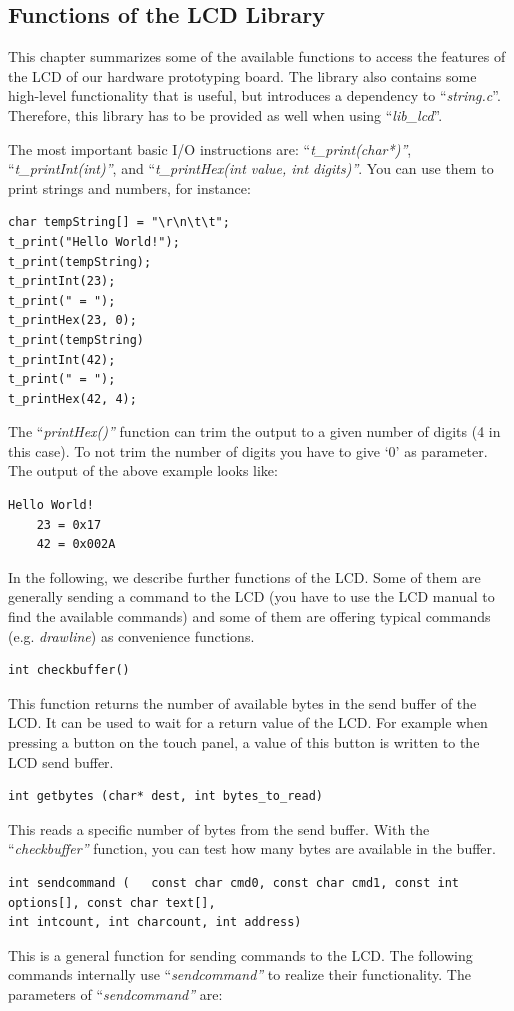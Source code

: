 \hypertarget{functions-of-the-lcd-library}{%
\subsection{Functions of the LCD
Library}\label{functions-of-the-lcd-library}}

This chapter summarizes some of the available functions to access the
features of the LCD of our hardware prototyping board. The library also
contains some high-level functionality that is useful, but introduces a
dependency to ``\emph{string.c}''. Therefore, this library has to be
provided as well when using ``\emph{lib\_lcd}''.

The most important basic I/O instructions are:
``\emph{t\_print(char*)''}, ``\emph{t\_printInt(int)''}, and
``\emph{t\_printHex(int value, int digits)''}. You can use them to print
strings and numbers, for instance:
\begin{lstlisting}
char tempString[] = "\r\n\t\t";
t_print("Hello World!");
t_print(tempString);
t_printInt(23);
t_print(" = ");
t_printHex(23, 0);
t_print(tempString)
t_printInt(42);
t_print(" = ");
t_printHex(42, 4);	
\end{lstlisting}
The ``\emph{printHex()''} function can trim the output to a given number
of digits (4 in this case). To not trim the number of digits you have to
give `0' as parameter. The output of the above example looks like:
\begin{lstlisting}
Hello World!
	23 = 0x17
	42 = 0x002A	
\end{lstlisting}
In the following, we describe further functions of the LCD. Some of them
are generally sending a command to the LCD (you have to use the LCD
manual \cite{eDIP} to find the available commands) and some of them are
offering typical commands (e.g. \emph{drawline}) as convenience
functions.
\begin{lstlisting}
int checkbuffer()
\end{lstlisting}
This function returns the number of available bytes in the send buffer
of the LCD. It can be used to wait for a return value of the LCD. For
example when pressing a button on the touch panel, a value of this
button is written to the LCD send buffer.
\begin{lstlisting}
int getbytes (char* dest, int bytes_to_read)
\end{lstlisting}
This reads a specific number of bytes from the send buffer. With the
``\emph{checkbuffer''} function, you can test how many bytes are
available in the buffer.
\begin{lstlisting}
int sendcommand (	const char cmd0, const char cmd1, const int options[], const char text[],
int intcount, int charcount, int address)
\end{lstlisting}
This is a general function for sending commands to the LCD. The
following commands internally use ``\emph{sendcommand''} to realize
their functionality. The parameters of ``\emph{sendcommand''} are:

